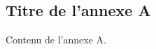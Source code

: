 \begin{appendices}

    \section*{Titre de l'annexe A}\label{sec:titre-de-l'annexe-a}
    Contenu de l'annexe A\@.

\end{appendices}
